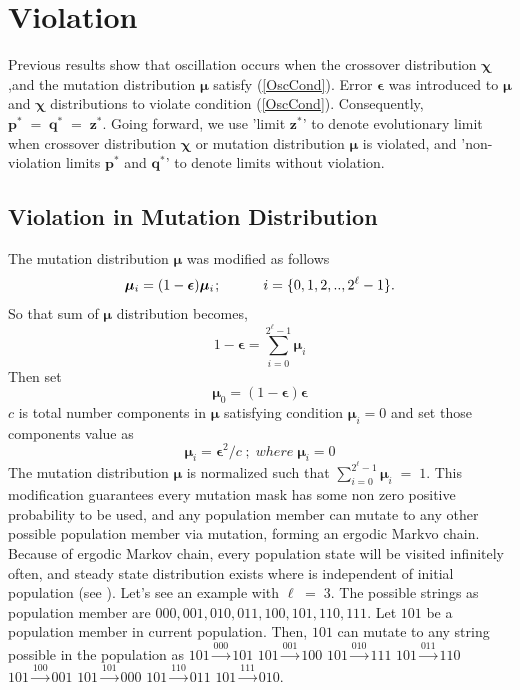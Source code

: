 \section{Violation}
Previous results show that oscillation occurs when the crossover distribution $\bm{\chi}$ ,and the mutation distribution $\bm{\mu}$ 
satisfy (\ref{OscCond}). Error $\bm{\epsilon}$ was introduced to $\bm{\mu}$ and $\bm{\chi}$ distributions to 
violate condition (\ref{OscCond}). Consequently, $\bm{p}^\ast \;=\; \bm{q}^\ast \;=\; \bm{z}^\ast$. 
Going forward, we use 'limit $\bm{z}^\ast$' to denote evolutionary limit when crossover distribution 
$\bm{\chi}$ or mutation distribution $\bm{\mu}$ is violated, and 
'non-violation limits $\bm{p}^\ast$ and $\bm{q}^\ast$' to denote limits without violation.

\subsection{Violation in Mutation Distribution}
The mutation distribution $\bm{\mu}$ was modified as follows
\[
\bm{\mu}_i = (1-\bm{\epsilon}) \bm{\mu}_i \hspace{0.01in}; \hspace{30pt} i = \{0, 1, 2,.., 2^{\ell}-1\}.
\]
So that sum of $\bm{\mu}$ distribution becomes, 
\[
1-\bm{\epsilon} = \sum \limits_{i=0}^{2^{\ell}-1} \bm{\mu}_i
\]
Then set
\[
\bm{\mu}_0 = (1-\bm{\epsilon})\bm{\epsilon}
\]
$c$ is total number components in $\bm{\mu}$ satisfying condition $\bm{\mu}_i = 0$ and set those components value as
\[
\bm{\mu}_i = \bm{\epsilon}^2/c \; ; \; where \; \bm{\mu}_i = 0
\]
The mutation distribution $\bm{\mu}$ is normalized such that  $\sum\limits_{i=0}^{2^{\ell}-1}\bm{\mu}_i \;=\; 1$.
This modification guarantees every mutation mask has some non zero positive probability to be used, and any population member can mutate to any other possible population member via mutation, forming an ergodic Markvo chain. Because of ergodic Markov chain, 
every population state will be visited infinitely often, and steady state distribution exists 
where is independent of initial population (see \cite{Nix1992}).   
Let's see an example with $\ell \;=\; 3$. 
The possible strings as population member are {$000, 001, 010, 011, 100, 101, 110, 111$}. 
Let $101$ be a population member in current population. Then, $101$ can mutate to any string possible in the population as \newline
$101 \xrightarrow{000} 101$ \newline
$101 \xrightarrow{001} 100$ \newline
$101 \xrightarrow{010} 111$ \newline
$101 \xrightarrow{011} 110$ \newline
$101 \xrightarrow{100} 001$ \newline
$101 \xrightarrow{101} 000$ \newline
$101 \xrightarrow{110} 011$ \newline
$101 \xrightarrow{111} 010$. \newline


